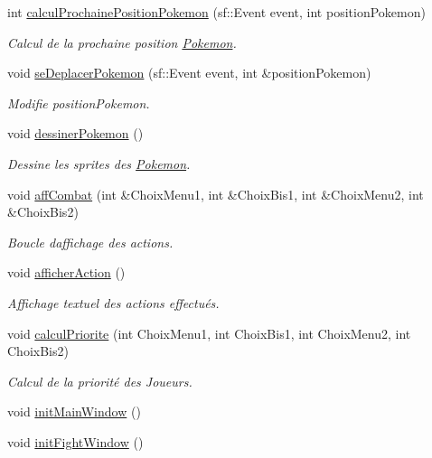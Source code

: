 \begin{DoxyCompactItemize}
int \hyperlink{class_s_f_m_l_combat_ab0728cc1b2fcc52112165ec8e3e14eb6}{calcul\+Prochaine\+Position\+Pokemon} (sf\+::\+Event event, int position\+Pokemon)
\begin{DoxyCompactList}\small\item\em Calcul de la prochaine position \hyperlink{class_pokemon}{Pokemon}. \end{DoxyCompactList}\item 
void \hyperlink{class_s_f_m_l_combat_ad6e349e747401615a1c3d5c56e59be76}{se\+Deplacer\+Pokemon} (sf\+::\+Event event, int \&position\+Pokemon)
\begin{DoxyCompactList}\small\item\em Modifie position\+Pokemon. \end{DoxyCompactList}\item 
void \hyperlink{class_s_f_m_l_combat_a22523f39138086a3b118a896ca214c4d}{dessiner\+Pokemon} ()
\begin{DoxyCompactList}\small\item\em Dessine les sprites des \hyperlink{class_pokemon}{Pokemon}. \end{DoxyCompactList}\item 
void \hyperlink{class_s_f_m_l_combat_a4b2bed6ea12c96a58e55d968b1652597}{aff\+Combat} (int \&Choix\+Menu1, int \&Choix\+Bis1, int \&Choix\+Menu2, int \&Choix\+Bis2)
\begin{DoxyCompactList}\small\item\em Boucle d\textquotesingle{}affichage des actions. \end{DoxyCompactList}\item 
void \hyperlink{class_s_f_m_l_combat_acc968da97d4c933f516e67b0356e3d73}{afficher\+Action} ()
\begin{DoxyCompactList}\small\item\em Affichage textuel des actions effectués. \end{DoxyCompactList}\item 
void \hyperlink{class_s_f_m_l_combat_af3dbb1374820d004fdf5907397760335}{calcul\+Priorite} (int Choix\+Menu1, int Choix\+Bis1, int Choix\+Menu2, int Choix\+Bis2)
\begin{DoxyCompactList}\small\item\em Calcul de la priorité des Joueurs. \end{DoxyCompactList}\item 
void \hyperlink{class_s_f_m_l_combat_a9d307eb8a3289a694486f30b56ca402d}{init\+Main\+Window} ()
\item 
void \hyperlink{class_s_f_m_l_combat_a5d363c2d06e7f0505990bf12866d0595}{init\+Fight\+Window} ()

\end{DoxyCompactItemize}
